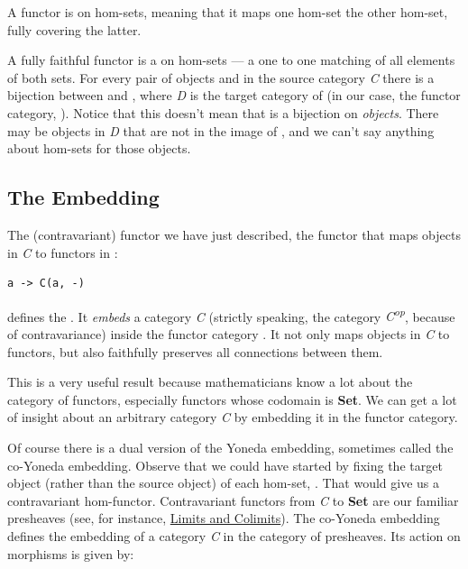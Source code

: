 A  functor is  on hom-sets, meaning that it
maps one hom-set  the other hom-set, fully covering the
latter.

A fully faithful functor  is a  on hom-sets
--- a one to one matching of all elements of both sets. For every pair
of objects  and  in the source category \emph{C}
there is a bijection between  and
, where \emph{D} is the target category of
 (in our case, the functor category, \code{{[}C,\ Set{]}}).
Notice that this doesn't mean that  is a bijection on
\emph{objects}. There may be objects in \emph{D} that are not in the
image of , and we can't say anything about hom-sets for those
objects.

\subsection{The Embedding}\label{the-embedding}

The (contravariant) functor we have just described, the functor that
maps objects in \emph{C} to functors in \code{{[}C,\ Set{]}}:

\begin{verbatim}
a -> C(a, -)
\end{verbatim}

defines the . It \emph{embeds} a category
\emph{C} (strictly speaking, the category \emph{C\textsuperscript{op}},
because of contravariance) inside the functor category
\code{{[}C,\ Set{]}}. It not only maps objects in \emph{C} to
functors, but also faithfully preserves all connections between them.

This is a very useful result because mathematicians know a lot about the
category of functors, especially functors whose codomain is
\textbf{Set}. We can get a lot of insight about an arbitrary category
\emph{C} by embedding it in the functor category.

Of course there is a dual version of the Yoneda embedding, sometimes
called the co-Yoneda embedding. Observe that we could have started by
fixing the target object (rather than the source object) of each
hom-set, . That would give us a contravariant
hom-functor. Contravariant functors from \emph{C} to \textbf{Set} are
our familiar presheaves (see, for instance,
\href{https://bartoszmilewski.com/2015/04/15/limits-and-colimits/}{Limits
and Colimits}). The co-Yoneda embedding defines the embedding of a
category \emph{C} in the category of presheaves. Its action on morphisms
is given by:

